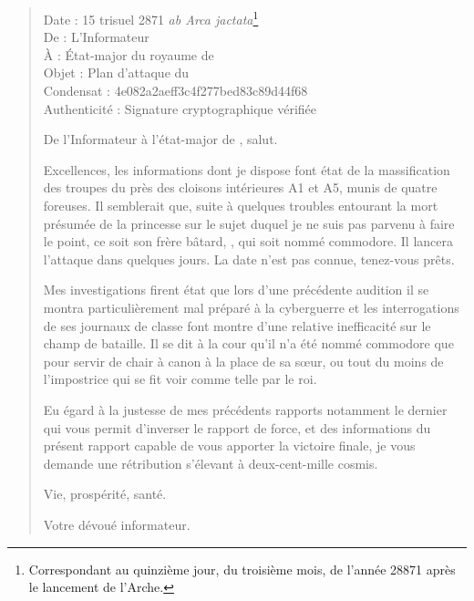 \begin{quotation}
  \ttfamily\RaggedRight
  \noindent{}Date : 15 trisuel 2871 \emph{ab Arca jactata}\footnote{Correspondant au quinzième jour, du troisième mois, de l’année 28871 après le lancement de l’Arche.}\\
  De : L’Informateur\\
  À : État-major du royaume de \campoppose{}\\
  Objet : Plan d’attaque du \campprincipal{}\\
  Condensat : 4e082a2aeff3c4f277bed83c89d44f68\\
  Authenticité : Signature cryptographique vérifiée
  \nopagebreak\vspace{1em}

  De l’Informateur à l’état-major de \campoppose{}, salut.
  \nopagebreak\vspace{1em}

  Excellences, les informations dont je dispose font état de la massification des troupes du \campprincipal{} près des cloisons intérieures A1 et A5, munis de quatre foreuses. Il semblerait que, suite à quelques troubles entourant la mort présumée de la princesse \princesse sur le sujet duquel je ne suis pas parvenu à faire le point, ce soit son frère bâtard, \elena, qui soit nommé commodore. Il lancera l’attaque dans quelques jours. La date n’est pas connue, tenez-vous prêts.

  Mes investigations firent état que lors d’une précédente audition il se montra particulièrement mal préparé à la cyberguerre et les interrogations de ses journaux de classe font montre d’une relative inefficacité sur le champ de bataille. Il se dit à la cour qu’il n’a été nommé commodore que pour servir de chair à canon à la place de sa sœur, ou tout du moins de l’impostrice qui se fit voir comme telle par le roi.

  Eu égard à la justesse de mes précédents rapports notamment le dernier qui vous permit d’inverser le rapport de force, et des informations du présent rapport capable de vous apporter la victoire finale, je vous demande une rétribution s’élevant à deux-cent-mille cosmis.

  \nopagebreak\vspace{1em}
  Vie, prospérité, santé.

  \nopagebreak\vspace{1em}
  \hfill Votre dévoué informateur.
\end{quotation}

